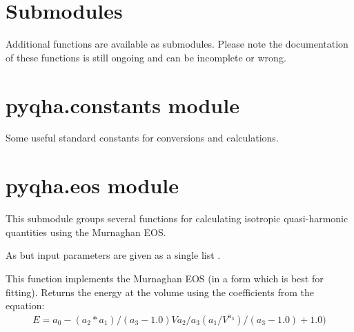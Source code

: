 \documentclass[letterpaper,10pt,english]{sphinxmanual}
\begin{document}
\section{Submodules}
\label{pyqha:submodules}
Additional functions are available as submodules. Please note the documentation of these functions is still ongoing and can be incomplete or wrong.


\section{pyqha.constants module}
\label{pyqha:pyqha-constants-module}\label{pyqha:module-pyqha.constants}
Some useful standard constants for conversions and calculations.


\section{pyqha.eos module}
\label{pyqha:pyqha-eos-module}\label{pyqha:module-pyqha.eos}
This submodule groups several functions for calculating isotropic quasi-harmonic
quantities using the Murnaghan EOS.

\begin{fulllineitems}
\label{pyqha:pyqha.eos.E_Murn}
As {\hyperref[pyqha:pyqha.eos.E_MurnV]{}} but input parameters are given as a single list 
.

\end{fulllineitems}


\begin{fulllineitems}
\label{pyqha:pyqha.eos.E_MurnV}
This function implements the Murnaghan EOS (in a form which is best for fitting).
Returns the energy at the volume  using the coefficients  
from the equation:
\begin{equation*}
\begin{split}E = a_0 - (a_2*a_1)/(a_3-1.0) V a_2/a_3 ( a_1/V^{a_3})/(a_3-1.0) +1.0 )\end{split}
\end{equation*}
\end{fulllineitems}
\end{document}
